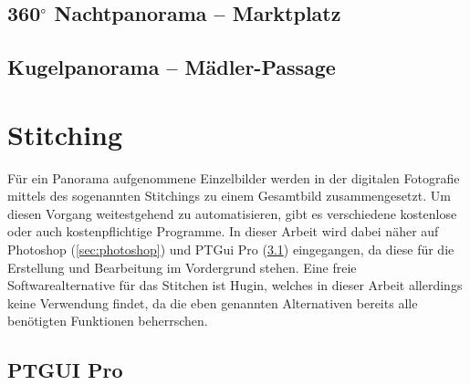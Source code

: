 \documentclass[liststotoc,bibtotoc,fontsize=14pt,]{scrreprt}
\begin{document}
	
	\section{360$^\circ$ Nachtpanorama -- Marktplatz}
	\label{sec:markt}
	
	\section{Kugelpanorama --  Mädler-Passage}
	\label{sec:kugel}
	
	\chapter{Stitching}
	\label{ch:stitiching}
	Für ein Panorama aufgenommene Einzelbilder werden in der digitalen Fotografie mittels des sogenannten Stitchings zu einem Gesamtbild zusammengesetzt. Um diesen Vorgang weitestgehend zu automatisieren, gibt es verschiedene kostenlose oder auch kostenpflichtige Programme. In dieser Arbeit wird dabei näher auf Photoshop (\ref{sec:photoshop}) und PTGui Pro (\ref{sec:ptgui}) eingegangen, da diese für die Erstellung und Bearbeitung im Vordergrund stehen. Eine freie Softwarealternative für das Stitchen ist Hugin, welches in dieser Arbeit allerdings keine Verwendung findet, da die eben genannten Alternativen bereits alle benötigten Funktionen beherrschen.
	
	\section{PTGUI Pro}
	\label{sec:ptgui}
	
\end{document}
